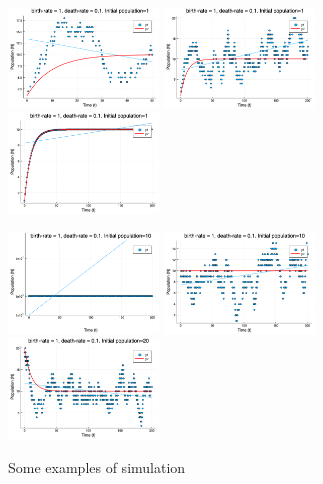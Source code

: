 \documentclass[10pt, usenames, dvipsnames, xcolor=table]{beamer}
\begin{document}
\begin{frame}
\begin{figure}[h]
\includegraphics[width=4cm]{1_01_1}
\includegraphics[width=4cm]{1_01_1_2}
\includegraphics[width=4cm]{1_01_1_numerical}
\end{figure}
\begin{figure}[h]
\includegraphics[width=4cm]{1_01_10}
\includegraphics[width=4cm]{1_01_10_2}
\includegraphics[width=4cm]{1_01_20}
\caption{Some examples of simulation}
\end{figure}
\end{frame}
\end{document}
